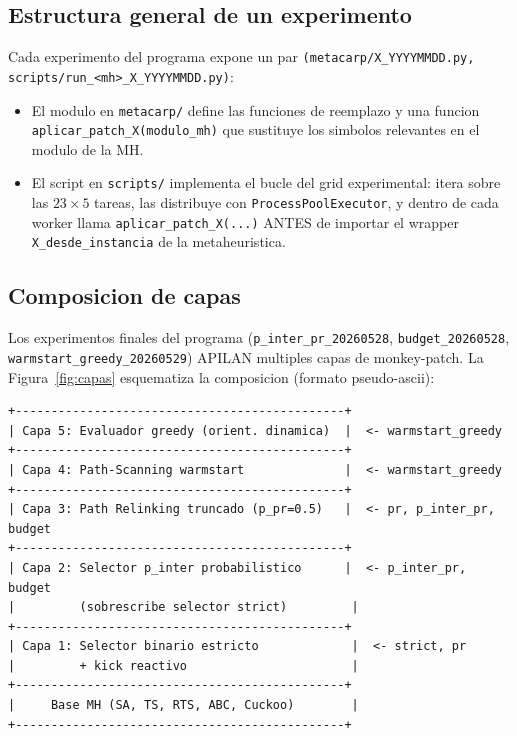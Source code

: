 \subsection{Estructura general de un experimento}

Cada experimento del programa expone un par
\texttt{(metacarp/X\_YYYYMMDD.py, scripts/run\_<mh>\_X\_YYYYMMDD.py)}:

\begin{itemize}
\item El modulo en \texttt{metacarp/} define las funciones de
  reemplazo y una funcion \texttt{aplicar\_patch\_X(modulo\_mh)} que
  sustituye los simbolos relevantes en el modulo de la MH.
\item El script en \texttt{scripts/} implementa el bucle del grid
  experimental: itera sobre las $23 \times 5$ tareas, las distribuye
  con \texttt{ProcessPoolExecutor}, y dentro de cada worker llama
  \texttt{aplicar\_patch\_X(...)} ANTES de importar el wrapper
  \texttt{X\_desde\_instancia} de la metaheuristica.
\end{itemize}

\subsection{Composicion de capas}

Los experimentos finales del programa (\texttt{p\_inter\_pr\_20260528},
\texttt{budget\_20260528}, \texttt{warmstart\_greedy\_20260529}) APILAN
multiples capas de monkey-patch. La Figura~\ref{fig:capas} esquematiza
la composicion (formato pseudo-ascii):

\begin{verbatim}
+----------------------------------------------+
| Capa 5: Evaluador greedy (orient. dinamica)  |  <- warmstart_greedy
+----------------------------------------------+
| Capa 4: Path-Scanning warmstart              |  <- warmstart_greedy
+----------------------------------------------+
| Capa 3: Path Relinking truncado (p_pr=0.5)   |  <- pr, p_inter_pr, budget
+----------------------------------------------+
| Capa 2: Selector p_inter probabilistico      |  <- p_inter_pr, budget
|         (sobrescribe selector strict)         |
+----------------------------------------------+
| Capa 1: Selector binario estricto             |  <- strict, pr
|         + kick reactivo                       |
+----------------------------------------------+
|     Base MH (SA, TS, RTS, ABC, Cuckoo)        |
+----------------------------------------------+
\end{verbatim}

